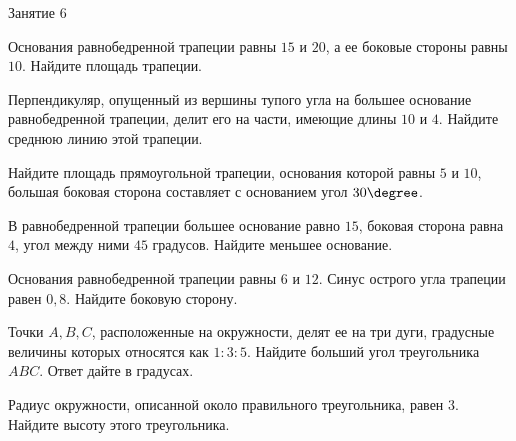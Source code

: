 
\begin{class}[number=6]
	\begin{listofex}
		\item Занятие 6
	\end{listofex}
\end{class}

\begin{homework}[number=3]
	\begin{listofex}
		\item Основания равнобедренной трапеции равны \(15\) и \(20\), а ее боковые стороны равны \(10\). Найдите площадь трапеции.
		\item Перпендикуляр, опущенный из вершины тупого угла на большее основание равнобедренной трапеции, делит его на части, имеющие длины \(10\) и \(4\). Найдите среднюю линию этой трапеции.
		\item Найдите площадь прямоугольной трапеции, основания которой равны \(5\) и \(10\), большая боковая сторона составляет с основанием угол \(30\degree \).
		\item В равнобедренной трапеции большее основание равно \(15\), боковая сторона равна \(4\), угол между ними \(45\) градусов. Найдите меньшее основание.
		\item Основания равнобедренной трапеции равны \(6\) и \(12\). Синус острого угла трапеции равен \(0,8\). Найдите боковую сторону.
		\item Точки \(A, B, C\), расположенные на окружности, делят ее на три дуги, градусные величины которых относятся как \(1 : 3 : 5\). Найдите больший угол треугольника \(ABC\). Ответ дайте в градусах.
		\item Радиус окружности, описанной около правильного треугольника, равен \(3\). Найдите высоту этого треугольника.
	\end{listofex}
\end{homework}

